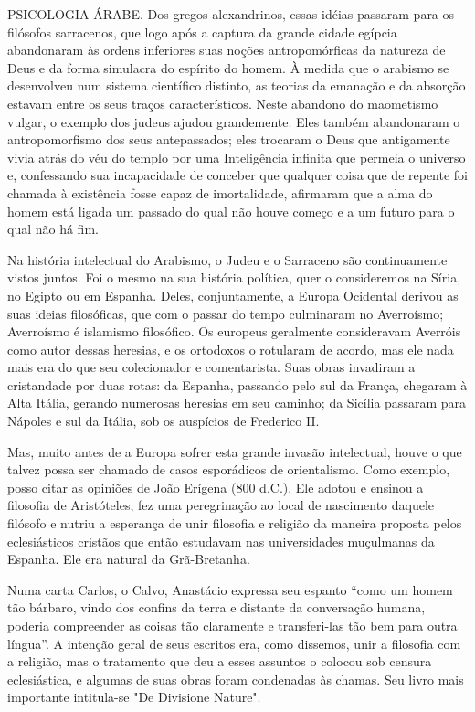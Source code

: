 \documentclass[11pt,a5paper,twoside,openany]{book}
\begin{document}
PSICOLOGIA ÁRABE. Dos gregos alexandrinos, essas idéias passaram para os filósofos sarracenos, que logo após a captura da grande cidade egípcia abandonaram às ordens inferiores suas noções antropomórficas da natureza de Deus e da forma simulacra do espírito do homem. À medida que o arabismo se desenvolveu num sistema científico distinto, as teorias da emanação e da absorção estavam entre os seus traços característicos. Neste abandono do maometismo vulgar, o exemplo dos judeus ajudou grandemente. Eles também abandonaram o antropomorfismo dos seus antepassados; eles trocaram o Deus que antigamente vivia atrás do véu do templo por uma Inteligência infinita que permeia o universo e, confessando sua incapacidade de conceber que qualquer coisa que de repente foi chamada à existência fosse capaz de imortalidade, afirmaram que a alma do homem está ligada um passado do qual não houve começo e a um futuro para o qual não há fim.

Na história intelectual do Arabismo, o Judeu e o Sarraceno são continuamente vistos juntos. Foi o mesmo na sua história política, quer o consideremos na Síria, no Egipto ou em Espanha. Deles, conjuntamente, a Europa Ocidental derivou as suas ideias filosóficas, que com o passar do tempo culminaram no Averroísmo; Averroísmo é islamismo filosófico. Os europeus geralmente consideravam Averróis como autor dessas heresias, e os ortodoxos o rotularam de acordo, mas ele nada mais era do que seu colecionador e comentarista. Suas obras invadiram a cristandade por duas rotas: da Espanha, passando pelo sul da França, chegaram à Alta Itália, gerando numerosas heresias em seu caminho; da Sicília passaram para Nápoles e sul da Itália, sob os auspícios de Frederico II.

Mas, muito antes de a Europa sofrer esta grande invasão intelectual, houve o que talvez possa ser chamado de casos esporádicos de orientalismo. Como exemplo, posso citar as opiniões de João Erígena (800 d.C.). Ele adotou e ensinou a filosofia de Aristóteles, fez uma peregrinação ao local de nascimento daquele filósofo e nutriu a esperança de unir filosofia e religião da maneira proposta pelos eclesiásticos cristãos que então estudavam nas universidades muçulmanas da Espanha. Ele era natural da Grã-Bretanha.

Numa carta Carlos, o Calvo, Anastácio expressa seu espanto “como um homem tão bárbaro, vindo dos confins da terra e distante da conversação humana, poderia compreender as coisas tão claramente e transferi-las tão bem para outra língua”. A intenção geral de seus escritos era, como dissemos, unir a filosofia com a religião, mas o tratamento que deu a esses assuntos o colocou sob censura eclesiástica, e algumas de suas obras foram condenadas às chamas. Seu livro mais importante intitula-se "De Divisione Nature".
\end{document}
